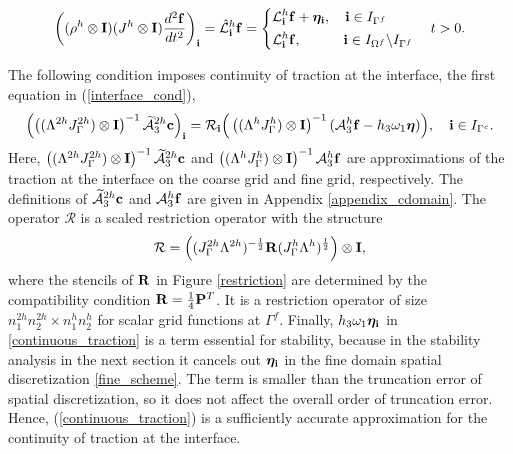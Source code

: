 {{%
\begin{align}\label{fine_scheme}
\left(({\rho}^h\otimes{\bf I})(J^h\otimes{\bf I})\frac{d^2{\bf f}}{dt^2}\right)_{\bf i} = \hat{\mathcal{L}}^h_{\bf i}{\bf f} = \left\{
\begin{aligned}
&\mathcal{L}^h_{\bf i}{\bf f} +{\bm \eta}_{\bf i}, \quad {\bf i}\in I_{\Gamma^f}\\
&\mathcal{L}^h_{\bf i}{\bf f},\quad\quad\quad {\bf i}\in I_{\Omega^f}\backslash I_{\Gamma^f} 
\end{aligned}
\right. \quad t > 0.
\end{align}

The following condition imposes continuity of traction at the interface, the first equation in (\ref{interface_cond}),
\begin{equation}\label{continuous_traction}
\left(\left((\Lambda^{2h}J_{\Gamma}^{2h})\otimes{\bf I}\right)^{-1}\wt{\mathcal{A}}_3^{2h}{\bf c}\right)_{\bf i}
= {\mathcal{R}}_{\bf i}\Big(\left((\Lambda^hJ_{\Gamma}^h)\otimes{\bf I}\right)^{-1}(\mathcal{A}_3^h{\bf f}-h_3\omega_1{\bm \eta})\Big), \quad {\bf i}\in I_{\Gamma^c}.
\end{equation}
Here,  $\left((\Lambda^{2h}J_{\Gamma}^{2h})\otimes{\bf I}\right)^{-1}\widetilde{\mathcal{A}}_3^{2h}{\bf c}$ and $\left((\Lambda^hJ_{\Gamma}^h)\otimes{\bf I}\right)^{-1}\mathcal{A}_3^h{\bf f}$ are approximations of the traction at the interface on the coarse grid and fine grid, respectively. The definitions of $\widetilde{\mathcal{A}}_3^{2h}{\bf c}$ and $\mathcal{A}_3^{h}{\bf f}$ are given in Appendix \ref{appendix_cdomain}. The operator $\mathcal{R}$ is a scaled restriction operator with the structure 
\begin{equation}\label{scaleR}
 {\mathcal{R}} =  \left(({J}^{2h}_\Gamma{\Lambda}^{2h})^{-\frac{1}{2}}{\bf R}({J}^{h}_\Gamma {\Lambda}^h)^{\frac{1}{2}}\right)\otimes {\bf I},
 \end{equation}
 where the stencils of ${\bf R}$  in Figure \ref{restriction} are determined by the compatibility condition ${\bf R}=\frac{1}{4}{\bf P}^T$. It is a restriction operator of size $n_1^{2h}n_2^{2h}\times n_1^hn_2^h$ for scalar grid functions at $\Gamma^f$.   Finally, $h_3\omega_1{\bm \eta}_{\bf i}$ in \eqref{continuous_traction} is a term essential for stability, because in the stability analysis in the next section it cancels out ${\bm \eta}_{\bf i}$ in the fine domain spatial discretization \eqref{fine_scheme}. The term is smaller than the truncation error of spatial discretization, so it does not affect the overall order of truncation error. Hence, (\ref{continuous_traction})  is a sufficiently accurate approximation for the continuity of traction at the interface.  
}}
